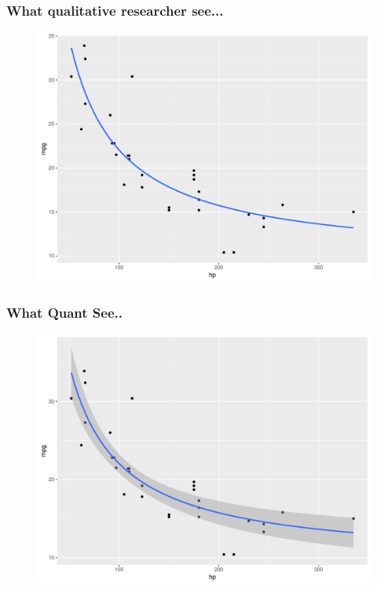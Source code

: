 \documentclass[12pt]{beamer}\usepackage[]{graphicx}\usepackage[]{color}
\begin{document}

\begin{frame}\large
\frametitle{What qualitative researcher see...}

\begin{figure}
 \includegraphics[width=0.7\paperwidth]{./Images/regQualit}
\end{figure}
\end{frame}



\begin{frame}\large
\frametitle{What Quant See..}

\begin{figure}
 \includegraphics[width=0.7\paperwidth]{./Images/CIreg}
\end{figure}
\end{frame}
\end{document}
